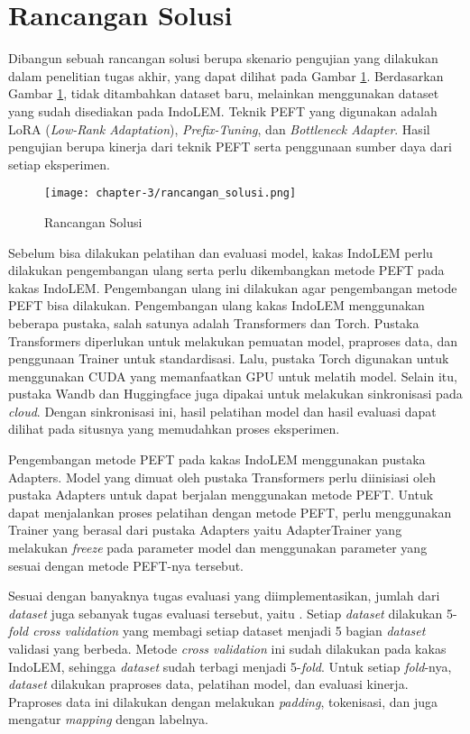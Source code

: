 \section{Rancangan Solusi}
\label{sec:rancangan-solusi}

Dibangun sebuah rancangan solusi berupa skenario pengujian yang dilakukan dalam penelitian tugas akhir, yang dapat dilihat pada Gambar \ref{fig:rancangan-solusi}. Berdasarkan Gambar \ref{fig:rancangan-solusi}, tidak ditambahkan dataset baru, melainkan menggunakan dataset yang sudah disediakan pada IndoLEM. Teknik PEFT yang digunakan adalah LoRA (\textit{Low-Rank Adaptation}), \textit{Prefix-Tuning}, dan \textit{Bottleneck Adapter}. Hasil pengujian berupa kinerja dari teknik PEFT serta penggunaan sumber daya dari setiap eksperimen.

\begin{figure}[ht]
    \centering
    \texttt{[image: chapter-3/rancangan\_solusi.png]}
    \caption{Rancangan Solusi}
    \label{fig:rancangan-solusi}
\end{figure}

Sebelum bisa dilakukan pelatihan dan evaluasi model, kakas IndoLEM perlu dilakukan pengembangan ulang serta perlu dikembangkan metode PEFT pada kakas IndoLEM. Pengembangan ulang ini dilakukan agar pengembangan metode PEFT bisa dilakukan. Pengembangan ulang kakas IndoLEM  menggunakan beberapa pustaka, salah satunya adalah Transformers dan Torch. Pustaka Transformers diperlukan untuk melakukan pemuatan model, praproses data, dan penggunaan Trainer untuk standardisasi. Lalu, pustaka Torch digunakan untuk menggunakan CUDA yang memanfaatkan GPU untuk melatih model. Selain itu, pustaka Wandb dan Huggingface juga  dipakai untuk melakukan sinkronisasi pada \textit{cloud}. Dengan sinkronisasi ini, hasil pelatihan model dan hasil evaluasi dapat dilihat pada situsnya yang  memudahkan proses eksperimen. 

Pengembangan metode PEFT pada kakas IndoLEM  menggunakan pustaka Adapters. Model yang dimuat oleh pustaka Transformers perlu diinisiasi oleh pustaka Adapters untuk dapat berjalan menggunakan metode PEFT. Untuk dapat menjalankan proses pelatihan dengan metode PEFT, perlu menggunakan Trainer yang berasal dari pustaka Adapters yaitu AdapterTrainer yang  melakukan \textit{freeze} pada parameter model dan  menggunakan parameter yang sesuai dengan metode PEFT-nya tersebut.

Sesuai dengan banyaknya tugas evaluasi yang diimplementasikan, jumlah dari \textit{dataset} juga sebanyak tugas evaluasi tersebut, yaitu \nlptask. Setiap \textit{dataset}  dilakukan 5-\textit{fold cross validation} yang membagi setiap dataset menjadi 5 bagian \textit{dataset} validasi yang berbeda. Metode \textit{cross validation} ini sudah dilakukan pada kakas IndoLEM, sehingga \textit{dataset} sudah terbagi menjadi 5-\textit{fold}. Untuk setiap \textit{fold}-nya, \textit{dataset}  dilakukan praproses data, pelatihan model, dan evaluasi kinerja. Praproses data ini dilakukan dengan melakukan \textit{padding}, tokenisasi, dan juga mengatur \textit{mapping} dengan labelnya. 

